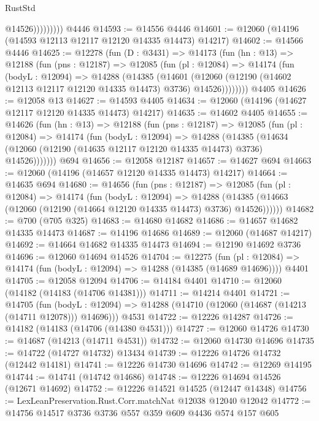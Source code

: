 \begin{lexlean}{RustStd}
\begin{coremodule}
                      @14526)))))))))
    @4446
@14593 := @14556 @4446
@14601 := @12060 (@14196 (@14593 @12113 @12117 @12120 @14335 @14473) @14217)
@14602 := @14566 @4446
@14625 := @12278
    (fun (D : @3431) =>
    @14173
      (fun (hn : @13) =>
      @12188
        (fun (pns : @12187) =>
        @12085
          (fun (pl : @12084) =>
          @14174
            (fun (bodyL : @12094) =>
            @14288
              (@14385
                (@14601
                  (@12060 (@12190 (@14602 @12113 @12117 @12120 @14335 @14473) @3736) @14526))))))))
    @4405
@14626 := @12058 @13
@14627 := @14593 @4405
@14634 := @12060 (@14196 (@14627 @12117 @12120 @14335 @14473) @14217)
@14635 := @14602 @4405
@14655 := @14626
    (fun (hn : @13) =>
    @12188
      (fun (pns : @12187) =>
      @12085
        (fun (pl : @12084) =>
        @14174
          (fun (bodyL : @12094) =>
          @14288
            (@14385
              (@14634 (@12060 (@12190 (@14635 @12117 @12120 @14335 @14473) @3736) @14526)))))))
    @694
@14656 := @12058 @12187
@14657 := @14627 @694
@14663 := @12060 (@14196 (@14657 @12120 @14335 @14473) @14217)
@14664 := @14635 @694
@14680 := @14656
    (fun (pns : @12187) =>
    @12085
      (fun (pl : @12084) =>
      @14174
        (fun (bodyL : @12094) =>
        @14288 (@14385 (@14663 (@12060 (@12190 (@14664 @12120 @14335 @14473) @3736) @14526))))))
@14682 := @700 (@705 @325)
@14683 := @14680 @14682
@14686 := @14657 @14682 @14335 @14473
@14687 := @14196 @14686
@14689 := @12060 (@14687 @14217)
@14692 := @14664 @14682 @14335 @14473
@14694 := @12190 @14692 @3736
@14696 := @12060 @14694 @14526
@14704 := @12275
    (fun (pl : @12084) => @14174 (fun (bodyL : @12094) => @14288 (@14385 (@14689 @14696))))
    @4401
@14705 := @12058 @12094
@14706 := @14184 @4401
@14710 := @12060 (@14182 (@14183 (@14706 @14381)))
@14711 := @14214 @4401
@14721 := @14705
    (fun (bodyL : @12094) => @14288 (@14710 (@12060 (@14687 (@14213 (@14711 @12078))) @14696)))
    @4531
@14722 := @12226 @14287
@14726 := @14182 (@14183 (@14706 (@14380 @4531)))
@14727 := @12060 @14726
@14730 := @14687 (@14213 (@14711 @4531))
@14732 := @12060 @14730 @14696
@14735 := @14722 (@14727 @14732) @13434
@14739 := @12226 @14726 @14732 (@12442 @14181)
@14741 := @12226 @14730 @14696
@14742 := @12269 @14195
@14744 := @14741 (@14742 @14686)
@14748 := @12226 @14694 @14526 (@12671 @14692)
@14752 := @12226 @14521 @14525 (@12447 @14348)
@14756 := LexLeanPreservation.Rust.Corr.matchNat @12038 @12040 @12042
@14772 := @14756
    @14517
    @3736
    @3736
    @557
    @359
    @609
    @4436
    @574
    @157
    @605

\end{coremodule}
\end{lexlean}
